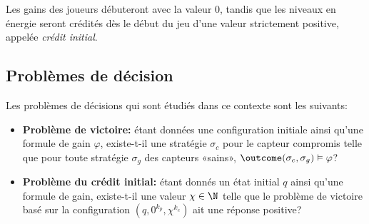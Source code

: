 Les gains des joueurs débuteront avec la valeur $0$, tandis que les niveaux en énergie seront crédités dès le début du jeu d'une valeur strictement positive, appelée \emph{crédit initial}.

\subsection{Problèmes de décision}

Les problèmes de décisions qui sont étudiés dans ce contexte sont les suivants:

\begin{itemize}
    \item \textbf{Problème de victoire:} étant données une configuration initiale ainsi qu'une formule de gain $\varphi$, existe-t-il une stratégie $\sigma_c$ pour le capteur compromis telle que pour toute stratégie $\sigma_g$ des capteurs «sains», $\outcome(\sigma_c,\sigma_g) \vDash \varphi$?
    \item \textbf{Problème du crédit initial:} étant donnés un état initial $q$ ainsi qu'une formule de gain, existe-t-il une valeur $\chi \in \N$ telle que le problème de victoire basé sur la configuration $(q,0^{k_p},\chi^{k_e})$ ait une réponse positive?
\end{itemize}
